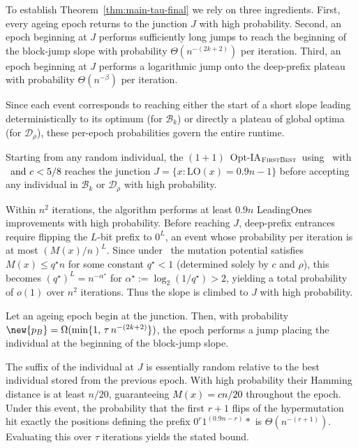 To establish Theorem~\ref{thm:main-tau-final} we rely on three ingredients.
First, every ageing epoch returns to the junction $J$ with high probability.
Second, an epoch beginning at $J$ performs sufficiently long jumps to reach the beginning of the block-jump slope with probability $\Theta(n^{-(2k+2)})$ per iteration.
Third, an epoch beginning at $J$ performs a logarithmic jump onto the deep-prefix plateau with probability $\Theta(n^{-\beta})$ per iteration.

Since each event corresponds to reaching either the start of a short slope leading deterministically to its optimum (for $\mathcal{B}_k$) or directly a plateau of global optima (for $\mathcal{D}_\rho$), these per-epoch probabilities govern the entire runtime.

\begin{lemma} \label{lem:junction-first-density-Bk}
	Starting from any random individual, the $(1+1)$~Opt-IA$_{\textsc{FirstBest}}$~using \IPHfcm{}~with \linHD~\textcolor{black}{and $c<5/8$}  reaches the junction $J = \{x : \mathrm{LO}(x)=0.9n-1\}$ before accepting any individual in $\mathcal{B}_k$ or $\mathcal{D}_\rho$ with high probability.
\end{lemma}

Within $n^2$ iterations, the algorithm performs at least $0.9n$ LeadingOnes 
improvements with high probability.  
Before reaching $J$, deep-prefix entrances require flipping the $L$-bit prefix 
to $0^L$, an event whose probability per iteration is at most $(M(x)/n)^L$.  
Since under \linHD\ the mutation potential satisfies $M(x) \le q^\star n$ for 
some constant $q^\star < 1$ (determined solely by $c$ and $\rho$), this becomes 
$(q^\star)^L = n^{-\alpha^\star}$ for $\alpha^\star := \log_2(1/q^\star) > 2$, 
yielding a total probability of $o(1)$ over $n^2$ iterations.
Thus the slope is climbed to $J$ with high probability.

\begin{lemma} \label{lem:BJO-epoch}
	Let an ageing epoch begin at the junction.
	Then, with probability $\new{p_B}=\Omega(\min\{1,\,\tau\,n^{-(2k+2)}\})$, the epoch performs a jump placing the individual at the beginning of the block-jump slope.
\end{lemma}

The suffix of the individual at $J$ is essentially random relative to the best individual stored from the 
previous epoch. 
With high probability their Hamming distance is at least $n/20$, guaranteeing 
\textcolor{black}{$M(x)= cn/20$} throughout the epoch.  
Under this event, the probability that the first $r+1$ flips of the hypermutation hit exactly the positions defining the prefix $0^{r}1^{(0.9n-r)} *$ is $\Theta(n^{-(r+1)})$.
Evaluating this over $\tau$ iterations yields the stated bound.

